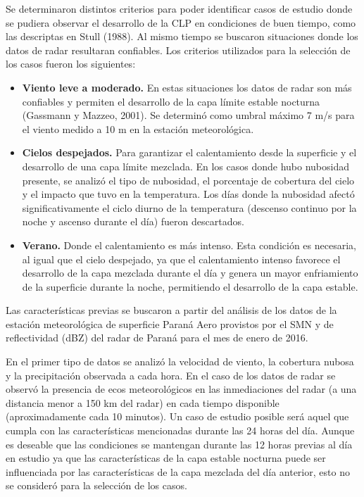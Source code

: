 \documentclass[12pt,spanish,oneside, a4paper]{book}
\providecommand{\tightlist}{%
  \setlength{\itemsep}{0pt}\setlength{\parskip}{0pt}}
\begin{document}
Se determinaron distintos criterios para poder identificar casos de
estudio donde se pudiera observar el desarrollo de la CLP en condiciones
de buen tiempo, como las descriptas en Stull (1988). Al mismo tiempo se
buscaron situaciones donde los datos de radar resultaran confiables. Los
criterios utilizados para la selección de los casos fueron los
siguientes:

\begin{itemize}
\tightlist
\item
  \textbf{Viento leve a moderado.} En estas situaciones los datos de
  radar son más confiables y permiten el desarrollo de la capa límite
  estable nocturna (Gassmann y Mazzeo, 2001). Se determinó como umbral
  máximo 7 m/s para el viento medido a 10 m en la estación
  meteorológica.
\item
  \textbf{Cielos despejados.} Para garantizar el calentamiento desde la
  superficie y el desarrollo de una capa límite mezclada. En los casos
  donde hubo nubosidad presente, se analizó el tipo de nubosidad, el
  porcentaje de cobertura del cielo y el impacto que tuvo en la
  temperatura. Los días donde la nubosidad afectó significativamente el
  ciclo diurno de la temperatura (descenso continuo por la noche y
  ascenso durante el día) fueron descartados.
\item
  \textbf{Verano.} Donde el calentamiento es más intenso. Esta condición
  es necesaria, al igual que el cielo despejado, ya que el calentamiento
  intenso favorece el desarrollo de la capa mezclada durante el día y
  genera un mayor enfriamiento de la superficie durante la noche,
  permitiendo el desarrollo de la capa estable.
\end{itemize}

Las características previas se buscaron a partir del análisis de los
datos de la estación meteorológica de superficie Paraná Aero provistos
por el SMN y de reflectividad (dBZ) del radar de Paraná para el mes de
enero de 2016.

En el primer tipo de datos se analizó la velocidad de viento, la
cobertura nubosa y la precipitación observada a cada hora. En el caso de
los datos de radar se observó la presencia de ecos meteorológicos en las
inmediaciones del radar (a una distancia menor a 150 km del radar) en
cada tiempo disponible (aproximadamente cada 10 minutos). Un caso de
estudio posible será aquel que cumpla con las características
mencionadas durante las 24 horas del día. Aunque es deseable que las
condiciones se mantengan durante las 12 horas previas al día en estudio
ya que las características de la capa estable nocturna puede ser
influenciada por las características de la capa mezclada del día
anterior, esto no se consideró para la selección de los casos.
\end{document}
